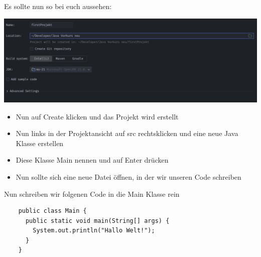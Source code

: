 \documentclass{../../sheet}
\begin{document}
Es sollte nun so bei euch aussehen:

\includegraphics[width=1\linewidth]{../img/projektCreation.png}

\begin{itemize}
  \item Nun auf Create klicken und das Projekt wird erstellt
  \item Nun links in der Projektansicht auf src rechtsklicken und eine neue Java Klasse erstellen
  \item Diese Klasse Main nennen und auf Enter drücken
  \item Nun sollte sich eine neue Datei öffnen, in der wir unseren Code schreiben
\end{itemize}

Nun schreiben wir folgenen Code in die Main Klasse rein
\begin{verbatim}
    public class Main {
      public static void main(String[] args) {
        System.out.println("Hallo Welt!");
      }
    }
  \end{verbatim}
\end{document}
